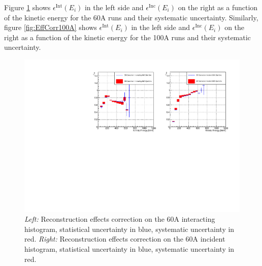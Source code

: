 Figure \ref{fig:EffCorr60A} shows $\epsilon^{\text{Int}}(E_{i})$ in the left side and $ \epsilon^{\text{Inc}}(E_i)$ on the right as a function of the kinetic energy for the 60A runs and their systematic uncertainty. Similarly, figure \ref{fig:EffCorr100A} shows $\epsilon^{\text{Int}}(E_{i})$ in the left side and $ \epsilon^{\text{Inc}}(E_i)$ on the right as a function of the kinetic energy for the 100A runs and their systematic uncertainty. 

\begin{figure}[p]
\centering
\includegraphics[width=\textwidth]{Chapter-6/Images/60AEffCorr.pdf}
\caption{\emph{Left:} Reconstruction effects correction on the 60A interacting histogram, statistical uncertainty in blue, systematic uncertainty in red. \emph{Right:}  Reconstruction effects correction on the 60A incident histogram, statistical uncertainty in blue, systematic uncertainty in red.}
\label{fig:EffCorr60A}
\end{figure}


